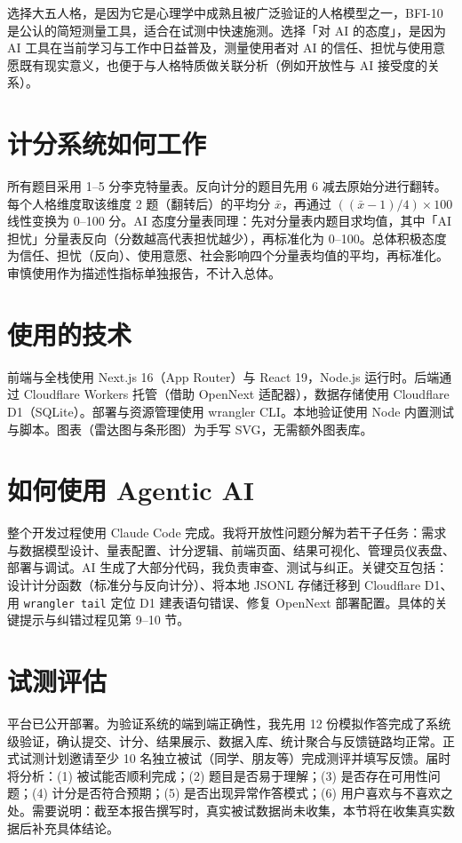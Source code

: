 \documentclass[11pt,a4paper]{ctexart}
\begin{document}
选择大五人格，是因为它是心理学中成熟且被广泛验证的人格模型之一，BFI-10 是公认的简短测量工具，适合在试测中快速施测。选择「对 AI 的态度」，是因为 AI 工具在当前学习与工作中日益普及，测量使用者对 AI 的信任、担忧与使用意愿既有现实意义，也便于与人格特质做关联分析（例如开放性与 AI 接受度的关系）。

\section{计分系统如何工作}

所有题目采用 1--5 分李克特量表。反向计分的题目先用 $6$ 减去原始分进行翻转。每个人格维度取该维度 2 题（翻转后）的平均分 $\bar{x}$，再通过 $((\bar{x}-1)/4)\times 100$ 线性变换为 0--100 分。AI 态度分量表同理：先对分量表内题目求均值，其中「AI 担忧」分量表反向（分数越高代表担忧越少），再标准化为 0--100。总体积极态度为信任、担忧（反向）、使用意愿、社会影响四个分量表均值的平均，再标准化。审慎使用作为描述性指标单独报告，不计入总体。

\section{使用的技术}

前端与全栈使用 Next.js 16（App Router）与 React 19，Node.js 运行时。后端通过 Cloudflare Workers 托管（借助 OpenNext 适配器），数据存储使用 Cloudflare D1（SQLite）。部署与资源管理使用 wrangler CLI。本地验证使用 Node 内置测试与脚本。图表（雷达图与条形图）为手写 SVG，无需额外图表库。

\section{如何使用 Agentic AI}

整个开发过程使用 Claude Code 完成。我将开放性问题分解为若干子任务：需求与数据模型设计、量表配置、计分逻辑、前端页面、结果可视化、管理员仪表盘、部署与调试。AI 生成了大部分代码，我负责审查、测试与纠正。关键交互包括：设计计分函数（标准分与反向计分）、将本地 JSONL 存储迁移到 Cloudflare D1、用 \texttt{wrangler tail} 定位 D1 建表语句错误、修复 OpenNext 部署配置。具体的关键提示与纠错过程见第 9--10 节。

\section{试测评估}

平台已公开部署。为验证系统的端到端正确性，我先用 12 份模拟作答完成了系统级验证，确认提交、计分、结果展示、数据入库、统计聚合与反馈链路均正常。正式试测计划邀请至少 10 名独立被试（同学、朋友等）完成测评并填写反馈。届时将分析：(1) 被试能否顺利完成；(2) 题目是否易于理解；(3) 是否存在可用性问题；(4) 计分是否符合预期；(5) 是否出现异常作答模式；(6) 用户喜欢与不喜欢之处。需要说明：截至本报告撰写时，真实被试数据尚未收集，本节将在收集真实数据后补充具体结论。
\end{document}
